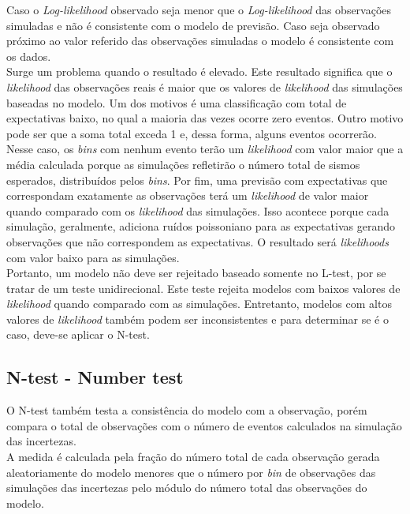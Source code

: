 Caso o {\it Log-likelihood} observado seja menor que o {\it Log-likelihood} das observações simuladas e não é consistente com o modelo de previsão. Caso seja observado próximo ao valor referido das observações simuladas o modelo é consistente com os dados.\\

Surge um problema quando o resultado é elevado. Este resultado significa que o {\it likelihood} das observações reais é maior que os valores de {\it likelihood} das simulações baseadas no modelo. Um dos motivos é uma classificação com total de expectativas baixo, no qual a maioria das vezes ocorre zero eventos. Outro motivo pode ser que a soma total exceda 1 e, dessa forma, alguns eventos ocorrerão. Nesse caso, os {\it bins} com nenhum evento terão um {\it likelihood} com valor maior que a média calculada porque as simulações refletirão o número total de sismos esperados, distribuídos pelos {\it bins}. Por fim, uma previsão com expectativas que correspondam exatamente as observações terá um {\it likelihood} de valor maior quando comparado com os {\it likelihood} das simulações. Isso acontece porque cada simulação, geralmente, adiciona ruídos poissoniano para as expectativas gerando observações que não correspondem as expectativas. O resultado será {\it likelihoods} com valor baixo para as simulações.\\

Portanto, um modelo não deve ser rejeitado baseado somente no L-test, por se tratar de um teste unidirecional. Este teste rejeita modelos com baixos valores de {\it likelihood} quando comparado com as simulações. Entretanto, modelos com altos valores de {\it likelihood} também podem ser inconsistentes e para determinar se é o caso, deve-se aplicar o N-test.\\
\subsection{N-test - Number test}
O N-test também testa a consistência do modelo com a observação, porém compara o total de observações com o número de eventos calculados na simulação das incertezas.\\ %

A medida é calculada pela fração do número total de cada observação gerada aleatoriamente do modelo menores que o número por {\it bin} de observações das simulações das incertezas pelo módulo do número total das observações do modelo.\\

